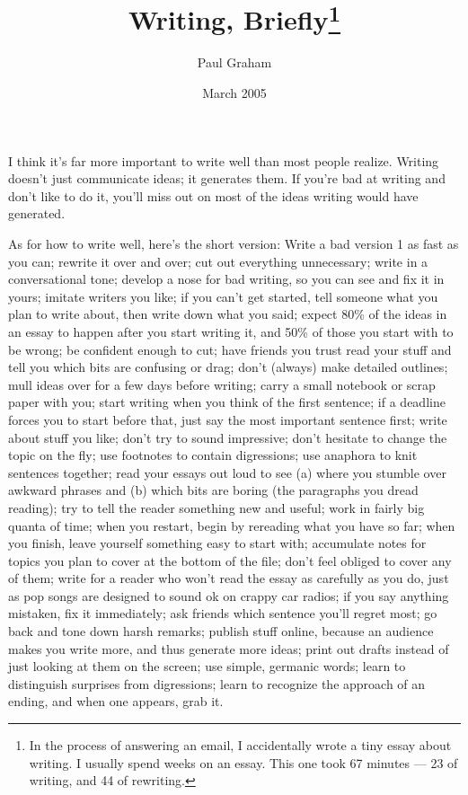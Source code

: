 \documentclass{simple}
\title{Writing, Briefly\footnote{In the process of answering an email, I
accidentally wrote a tiny essay about writing. I usually spend weeks on
an essay. This one took 67 minutes --- 23 of writing, and 44 of rewriting.}}
\author{Paul Graham}
\date{March 2005}
\begin{document}
\maketitle

I think it's far more important to write well than most people realize. Writing
doesn't just communicate ideas; it generates them. If you're bad at writing and
don't like to do it, you'll miss out on most of the ideas writing would have
generated.

As for how to write well, here's the short version: Write a bad version 1 as
fast as you can; rewrite it over and over; cut out everything unnecessary;
write in a conversational tone; develop a nose for bad writing, so you can see
and fix it in yours; imitate writers you like; if you can't get started, tell
someone what you plan to write about, then write down what you said; expect
80\% of the ideas in an essay to happen after you start writing it, and 50\% of
those you start with to be wrong; be confident enough to cut; have friends you
trust read your stuff and tell you which bits are confusing or drag; don't
(always) make detailed outlines; mull ideas over for a few days before writing;
carry a small notebook or scrap paper with you; start writing when you think of
the first sentence; if a deadline forces you to start before that, just say the
most important sentence first; write about stuff you like; don't try to sound
impressive; don't hesitate to change the topic on the fly; use footnotes to
contain digressions; use anaphora to knit sentences together; read your essays
out loud to see (a) where you stumble over awkward phrases and (b) which bits
are boring (the paragraphs you dread reading); try to tell the reader something
new and useful; work in fairly big quanta of time; when you restart, begin by
rereading what you have so far; when you finish, leave yourself something easy
to start with; accumulate notes for topics you plan to cover at the bottom of
the file; don't feel obliged to cover any of them; write for a reader who won't
read the essay as carefully as you do, just as pop songs are designed to sound
ok on crappy car radios; if you say anything mistaken, fix it immediately; ask
friends which sentence you'll regret most; go back and tone down harsh remarks;
publish stuff online, because an audience makes you write more, and thus
generate more ideas; print out drafts instead of just looking at them on the
screen; use simple, germanic words; learn to distinguish surprises from
digressions; learn to recognize the approach of an ending, and when one
appears, grab it.
\end{document}
